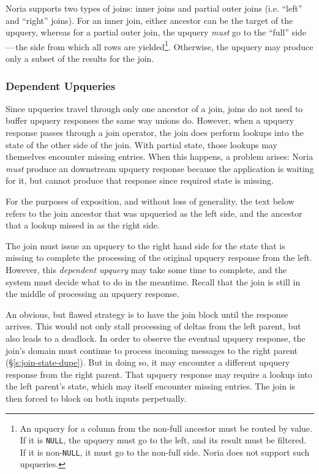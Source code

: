 Noria supports two types of joins: inner joins and partial outer joins (i.e.
``left'' and ``right'' joins). For an inner join, either ancestor can be the
target of the upquery, whereas for a partial outer join, the upquery \emph{must}
go to the ``full'' side\,---\,the side from which all rows are
yielded\footnote{An upquery for a column from the non-full ancestor must be
routed by value. If it is \texttt{NULL}, the upquery must go to the left, and
its result must be filtered. If it is non-\texttt{NULL}, it must go to the
non-full side. Noria does not support such upqueries.}. Otherwise, the upquery
may produce only a subset of the results for the join.

\subsubsection{Dependent Upqueries}

Since upqueries travel through only one ancestor of a join, joins do not need to
buffer upquery responses the same way unions do. However, when a upquery
response passes through a join operator, the join does perform lookups into the
state of the other side of the join. With partial state, those lookups may
themselves encounter missing entries. When this happens, a problem arises: Noria
\emph{must} produce an downstream upquery response because the application is
waiting for it, but cannot produce that response since required state is
missing.

For the purposes of exposition, and without loss of generality, the text below
refers to the join ancestor that was upqueried as the left side, and the
ancestor that a lookup missed in as the right side.

The join must issue an upquery to the right hand side for the state that is
missing to complete the processing of the original upquery response from the
left. However, this \textit{dependent upquery} may take some time to complete,
and the system must decide what to do in the meantime. Recall that the join is
still in the middle of processing an upquery response.

An obvious, but flawed strategy is to have the join block until the response
arrives. This would not only stall processing of deltas from the left parent,
but also leads to a deadlock. In order to observe the eventual upquery response,
the join's domain must continue to process incoming messages to the right parent
(\S\ref{s:join-state-dupe}). But in doing so, it may encounter a different
upquery response from the right parent. That upquery response may require a
lookup into the left parent's state, which may itself encounter missing entries.
The join is then forced to block on both inputs perpetually.

